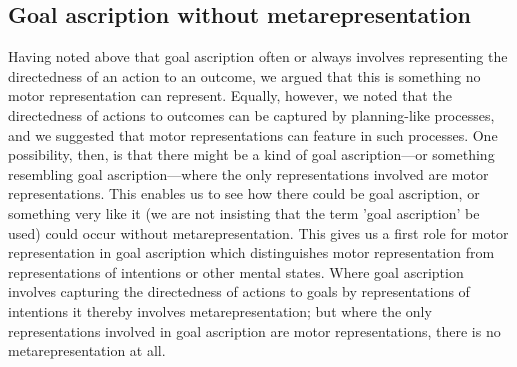 \documentclass[12pt,\papersize]{extarticle}
\begin{document}
\subsection{Goal ascription without metarepresentation}
Having noted above that goal ascription often or always involves representing the directedness of an action to an outcome, we argued that this is something no motor representation can represent. Equally, however, we noted that the directedness of actions to outcomes can be captured by planning-like processes, and we suggested that motor representations can feature in such processes.  One possibility, then, is that there might be a kind of goal ascription---or something resembling goal ascription---where the only representations involved are motor representations.  This enables us to see how there could be goal ascription, or something very like it (we are not insisting that the term 'goal ascription' be used) could occur without metarepresentation. This gives us a first role for motor representation in goal ascription which distinguishes motor representation from representations of intentions or other mental states.  Where goal ascription involves capturing the directedness of actions to goals by representations of intentions it thereby involves metarepresentation; but where the only representations involved in goal ascription are motor representations, there is no metarepresentation at all.
\end{document}

